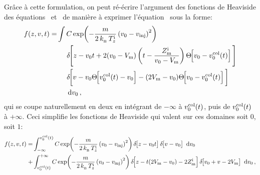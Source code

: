{Grâce à cette formulation, on peut ré-écrire l'argument des fonctions de Heaviside des équations~ et~ de manière à exprimer l'équation~ sous la forme:
\begin{align}
	f(z,v,t)
	=&
	\int
	{
	C \Expo{-\frac{m}{2\,\kb\,\Tlongini} 
	\left( \vini - \vinj \right)^2}
	}
	\nonumber\\	%
	&	\;\;\;\;\; 
	{\DIRAC{z - \vini t + 2(\vini-\Vmir)\left(t - \frac{\Zmirini}{\vini - \Vmir}\right) \Heaviside{\vini - \vinicol(t)} }
	}
	\nonumber\\
	&	\;\;\;\;\;
	{\DIRAC{v - \vini \Heaviside{\vinicol(t) - \vini} - (2 \Vmir - \vini) \Heaviside{\vini - \vinicol(t)}}
	}
	\nonumber\\
	&	\;\;\;\;\; \ddint \vini \nonumber
	\virguleformule
\end{align}
qui se coupe naturellement en deux en intégrant de $-\infty$ à $v_{0}^{\rm col}(t)$, puis de $v_{0}^{\rm col}(t)$ à $+\infty$. Ceci simplifie les fonctions de Heaviside qui valent sur ces domaines soit $0$, soit $1$:
\begin{align}
	f(z,v,t)	=&
	\IntegraleBornes{
	C \Expo{-\frac{m}{2\,\kb\,\Tlongini} \left( \vini - \vinj \right)^2}
	\Dirac{z - \vini t}
	\Dirac{v - \vini}
	}{\ddint \vini}{-\infty}{\vinicol(t)} \nonumber \\
	+&\IntegraleBornes{
	C \Expo{-\frac{m}{2\,\kb\,\Tlongini} \left( \vini - \vinj \right)^2}
	\Dirac{z - t( 2\Vmir-\vini) - 2 \Zmirini}
	\Dirac{\vini + v - 2 \Vmir}
	}{\ddint \vini}{\vinicol(t)}{+\infty} \nonumber
	\virguleformule
\end{align}

}
%
